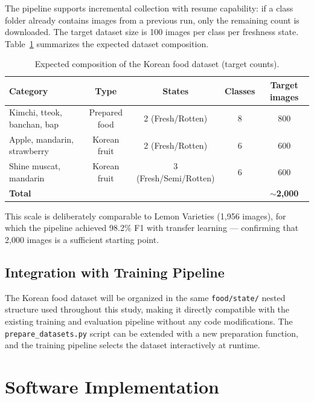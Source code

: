 \documentclass[12pt, a4paper]{article}
\begin{document}
The pipeline supports incremental collection with resume capability:
if a class folder already contains images from a previous run, only the
remaining count is downloaded.
The target dataset size is 100 images per class per freshness state.
Table~\ref{tab:korean_counts} summarizes the expected dataset composition.

\begin{table}[h]
\centering
\caption{Expected composition of the Korean food dataset (target counts).}
\label{tab:korean_counts}
\begin{tabular}{lcccc}
\toprule
\textbf{Category} & \textbf{Type} & \textbf{States} & \textbf{Classes} & \textbf{Target images} \\
\midrule
Kimchi, tteok, banchan, bap & Prepared food & 2 (Fresh/Rotten)       & 8  & 800  \\
Apple, mandarin, strawberry  & Korean fruit  & 2 (Fresh/Rotten)       & 6  & 600  \\
Shine muscat, mandarin       & Korean fruit  & 3 (Fresh/Semi/Rotten)  & 6  & 600  \\
\midrule
\multicolumn{4}{l}{\textbf{Total}}                                    & \textbf{$\sim$2,000} \\
\bottomrule
\end{tabular}
\end{table}

This scale is deliberately comparable to Lemon Varieties (1,956 images),
for which the pipeline achieved 98.2\% F1 with transfer learning ---
confirming that 2,000 images is a sufficient starting point.

\subsection{Integration with Training Pipeline}

The Korean food dataset will be organized in the same
\texttt{food/state/} nested structure used throughout this study,
making it directly compatible with the existing training and evaluation
pipeline without any code modifications.
The \texttt{prepare\_datasets.py} script can be extended with a new
preparation function, and the training pipeline selects the dataset
interactively at runtime.

\section{Software Implementation}
\end{document}
